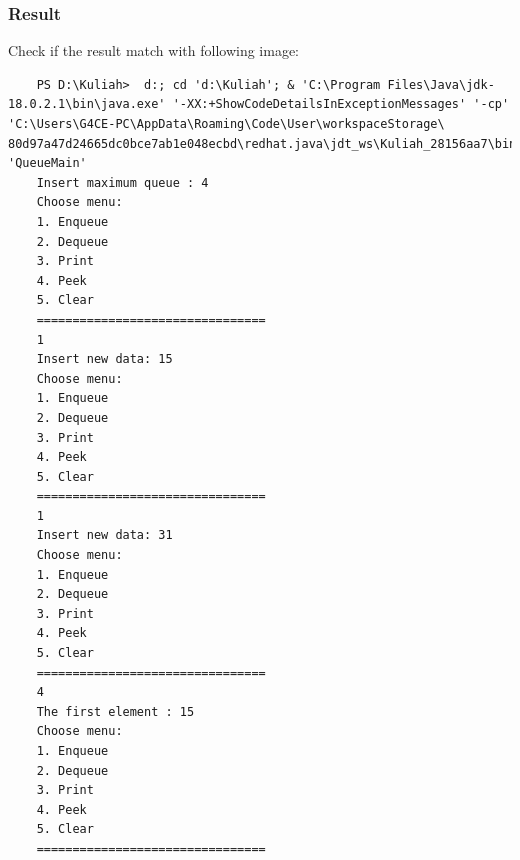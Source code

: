 \documentclass[12pt,titlepage]{article}
\begin{document}
\subsubsection{Result}
Check if the result match with following image:
\begin{verbatim}
    PS D:\Kuliah>  d:; cd 'd:\Kuliah'; & 'C:\Program Files\Java\jdk-18.0.2.1\bin\java.exe' '-XX:+ShowCodeDetailsInExceptionMessages' '-cp' 'C:\Users\G4CE-PC\AppData\Roaming\Code\User\workspaceStorage\ 80d97a47d24665dc0bce7ab1e048ecbd\redhat.java\jdt_ws\Kuliah_28156aa7\bin' 'QueueMain' 
    Insert maximum queue : 4
    Choose menu: 
    1. Enqueue
    2. Dequeue
    3. Print
    4. Peek
    5. Clear
    ================================
    1
    Insert new data: 15
    Choose menu: 
    1. Enqueue
    2. Dequeue
    3. Print
    4. Peek
    5. Clear
    ================================
    1
    Insert new data: 31
    Choose menu: 
    1. Enqueue
    2. Dequeue
    3. Print
    4. Peek
    5. Clear
    ================================
    4
    The first element : 15
    Choose menu:
    1. Enqueue
    2. Dequeue
    3. Print
    4. Peek
    5. Clear
    ================================
\end{verbatim}
\end{document}

